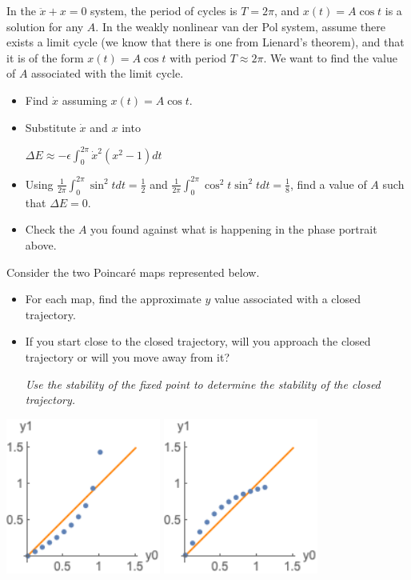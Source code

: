 \documentclass[12pt,letterpaper,noanswers]{exam}
\begin{document}
\begin{questions}
\begin{parts}
In the $\ddot x + x = 0$ system, the period of cycles is $T = 2\pi$, and $x(t) = A\cos t$ is a solution for any $A$.  In the weakly nonlinear van der Pol system, assume there exists a limit cycle (we know that there is one from Lienard's theorem), and that it is of the form $x(t) = A\cos t$ with period $T\approx 2\pi$.  We want to find the value of $A$ associated with the limit cycle.
\begin{itemize}
    \item Find $\dot x$ assuming $x(t) = A\cos t$.
    \item Substitute $\dot x$ and $x$ into 

$\Delta E \approx -\epsilon \int_0^{2\pi} \dot x^2 (x^2-1) dt$

\item  Using $\displaystyle \frac{1}{2\pi} \int_0^{2\pi} \sin^2 t dt = \frac{1}{2}$ and $\displaystyle \frac{1}{2\pi}\int_0^{2\pi} \cos^2 t\sin^2 t dt = \frac{1}{8}$, find a value of $A$ such that $\Delta E = 0$.
\item Check the $A$ you found against what is happening in the phase portrait above.
\end{itemize}

\end{parts}

\item Consider the two Poincar\'e maps represented below.  
\begin{itemize}
    \item For each map, find the approximate $y$ value associated with a closed trajectory.
    \item If you start close to the closed trajectory, will you approach the closed trajectory or will you move away from it?
    
    \emph{Use the stability of the fixed point to determine the stability of the closed trajectory.}
\end{itemize}

\includegraphics[width=2in]{img/191018-C18p3.png}
\includegraphics[width=2in]{img/191018-C18p4.png}



\end{questions}
\end{document}
